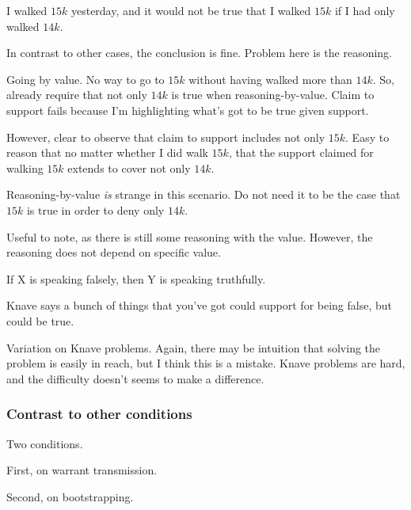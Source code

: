 \begin{note}[Problematic]
  \begin{illustration}
    I walked \(15k\) yesterday, and it would not be true that I walked \(15k\) if I had only walked \(14k\).
  \end{illustration}
  In contrast to other cases, the conclusion is fine.
  Problem here is the reasoning.

  Going by value.
  No way to go to \(15k\) without having walked more than \(14k\).
  So, already require that not only \(14k\) is true when reasoning-by-value.
  Claim to support fails because I'm highlighting what's got to be true given support.

  However, clear to observe that claim to support includes not only \(15k\).
  Easy to reason that no matter whether I did walk \(15k\), that the support claimed for walking \(15k\) extends to cover not only \(14k\).

  Reasoning-by-value \emph{is} strange in this scenario.
  Do not need it to be the case that \(15k\) is true in order to deny only \(14k\).


  Useful to note, as there is still some reasoning with the value.
  However, the reasoning does not depend on specific value.
\end{note}

\begin{note}[Knaves]
  \begin{illustration}
    If X is speaking falsely, then Y is speaking truthfully.

    Knave says a bunch of things that you've got could support for being false, but could be true.
  \end{illustration}
  Variation on Knave problems.
  Again, there may be intuition that solving the problem is easily in reach, but I think this is a mistake.
  Knave problems are hard, and the difficulty doesn't seems to make a difference.
\end{note}

\newpage

\subsubsection{Contrast to other conditions}
\label{sec:contr-other-cond}

\begin{note}
  Two conditions.

  First, \citeauthor{Wright:2011wn} on warrant transmission.

  Second, \citeauthor{Weisberg:2010to} on bootstrapping.
\end{note}

